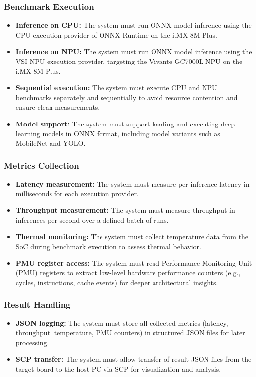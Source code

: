 \subsubsection*{Benchmark Execution}
\begin{itemize}
    \item \textbf{Inference on CPU:} The system must run ONNX model inference using the CPU execution provider of ONNX Runtime on the i.MX 8M Plus.
    \item \textbf{Inference on NPU:} The system must run ONNX model inference using the VSI NPU execution provider, targeting the Vivante GC7000L NPU on the i.MX 8M Plus.
    \item \textbf{Sequential execution:} The system must execute CPU and NPU benchmarks separately and sequentially to avoid resource contention and ensure clean measurements.
    \item \textbf{Model support:} The system must support loading and executing deep learning models in ONNX format, including model variants such as MobileNet and YOLO.
\end{itemize}

\subsubsection*{Metrics Collection}
\begin{itemize}
    \item \textbf{Latency measurement:} The system must measure per-inference latency in milliseconds for each execution provider.
    \item \textbf{Throughput measurement:} The system must measure throughput in inferences per second over a defined batch of runs.
    \item \textbf{Thermal monitoring:} The system must collect temperature data from the SoC during benchmark execution to assess thermal behavior.
    \item \textbf{PMU register access:} The system must read Performance Monitoring Unit (PMU) registers to extract low-level hardware performance counters (e.g., cycles, instructions, cache events) for deeper architectural insights.
\end{itemize}

\subsubsection*{Result Handling}
\begin{itemize}
    \item \textbf{JSON logging:} The system must store all collected metrics (latency, throughput, temperature, PMU counters) in structured JSON files for later processing.
    \item \textbf{SCP transfer:} The system must allow transfer of result JSON files from the target board to the host PC via SCP for visualization and analysis.
\end{itemize}

